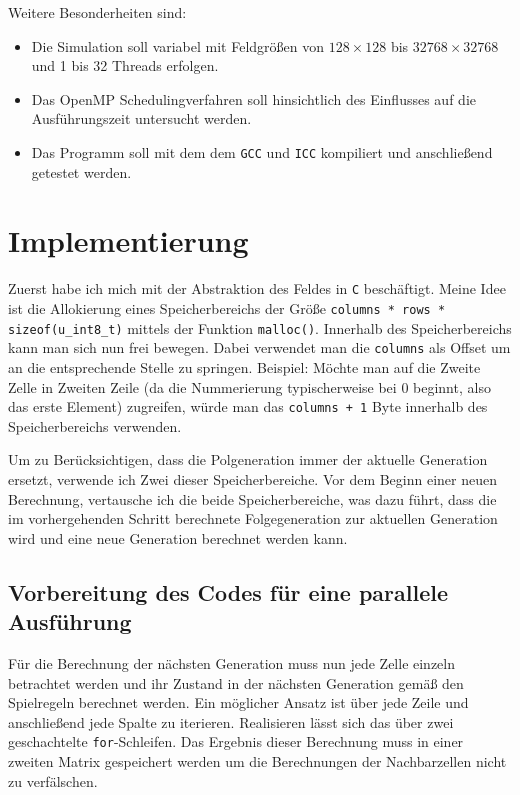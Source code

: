 \documentclass[german,plainarticle,hyperref,utf8]{zihpub}
\begin{document}
	Weitere Besonderheiten sind:
	\begin{itemize}
		\item Die Simulation soll variabel mit Feldgrößen von $128\times 128$ bis $32768\times 32768$ und 1 bis 32 Threads erfolgen.
		\item Das OpenMP Schedulingverfahren soll hinsichtlich des Einflusses auf die Ausführungszeit untersucht werden.
		\item Das Programm soll mit dem dem \texttt{GCC} und \texttt{ICC} kompiliert und anschließend getestet werden.
	\end{itemize}

	\section{Implementierung}
	 Zuerst habe ich mich mit der Abstraktion des Feldes in \texttt{C} beschäftigt. Meine Idee ist die Allokierung eines Speicherbereichs der Größe \texttt{columns * rows * sizeof(u\_int8\_t)} mittels der Funktion \texttt{malloc()}. Innerhalb des Speicherbereichs kann man sich nun frei bewegen. Dabei verwendet man die \texttt{columns} als Offset um an die entsprechende Stelle zu springen.
	 Beispiel: Möchte man auf die Zweite Zelle in Zweiten Zeile (da die Nummerierung typischerweise bei 0 beginnt, also das erste Element) zugreifen, würde man das \texttt{columns + 1} Byte innerhalb des Speicherbereichs verwenden.
	 
	 Um zu Berücksichtigen, dass die Polgeneration immer der aktuelle Generation ersetzt, verwende ich Zwei dieser Speicherbereiche. Vor dem Beginn einer neuen Berechnung, vertausche ich die beide Speicherbereiche, was dazu führt, dass die im vorhergehenden Schritt berechnete Folgegeneration zur aktuellen Generation wird und eine neue Generation berechnet werden kann.
	
	
	
	
	
	\subsection{Vorbereitung des Codes für eine parallele Ausführung}
	Für die Berechnung der nächsten Generation muss nun jede Zelle einzeln betrachtet werden und ihr Zustand in der nächsten Generation gemäß den Spielregeln berechnet werden.
	Ein möglicher Ansatz ist über jede Zeile und anschließend jede Spalte zu iterieren. Realisieren lässt sich das über zwei geschachtelte \verb|for|-Schleifen. Das Ergebnis dieser Berechnung muss in einer zweiten Matrix gespeichert werden um die Berechnungen der Nachbarzellen nicht zu verfälschen.
	
\end{document}
